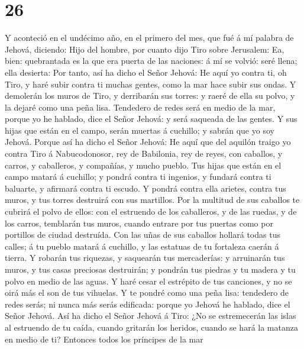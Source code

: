 \hypertarget{section-25}{%
\section{26}\label{section-25}}

 Y aconteció en el undécimo año, en el primero del mes,
que fué á mí palabra de Jehová, diciendo:  Hijo del
hombre, por cuanto dijo Tiro sobre Jerusalem: Ea, bien: quebrantada es
la que era puerta de las naciones: á mí se volvió: seré llena; ella
desierta:  Por tanto, así ha dicho el Señor Jehová: He
aquí yo contra ti, oh Tiro, y haré subir contra ti muchas gentes, como
la mar hace subir sus ondas.  Y demolerán los muros de
Tiro, y derribarán sus torres: y raeré de ella su polvo, y la dejaré
como una peña lisa.  Tendedero de redes será en medio de
la mar, porque yo he hablado, dice el Señor Jehová: y será saqueada de
las gentes.  Y sus hijas que están en el campo, serán
muertas á cuchillo; y sabrán que yo soy Jehová.  Porque
así ha dicho el Señor Jehová: He aquí que del aquilón traigo yo contra
Tiro á Nabucodonosor, rey de Babilonia, rey de reyes, con caballos, y
carros, y caballeros, y compañías, y mucho pueblo.  Tus
hijas que están en el campo matará á cuchillo; y pondrá contra ti
ingenios, y fundará contra ti baluarte, y afirmará contra ti escudo.
 Y pondrá contra ella arietes, contra tus muros, y tus
torres destruirá con sus martillos.  Por la multitud de
sus caballos te cubrirá el polvo de ellos: con el estruendo de los
caballeros, y de las ruedas, y de los carros, temblarán tus muros,
cuando entrare por tus puertas como por portillos de ciudad destruída.
 Con las uñas de sus caballos hollará todas tus calles; á
tu pueblo matará á cuchillo, y las estatuas de tu fortaleza caerán á
tierra.  Y robarán tus riquezas, y saquearán tus
mercaderías: y arruinarán tus muros, y tus casas preciosas destruirán; y
pondrán tus piedras y tu madera y tu polvo en medio de las aguas.
 Y haré cesar el estrépito de tus canciones, y no se oirá
más el son de tus vihuelas.  Y te pondré como una peña
lisa: tendedero de redes serás; ni nunca más serás edificada: porque yo
Jehová he hablado, dice el Señor Jehová.  Así ha dicho el
Señor Jehová á Tiro: ¿No se estremecerán las islas al estruendo de tu
caída, cuando gritarán los heridos, cuando se hará la matanza en medio
de ti?  Entonces todos los príncipes de la mar

